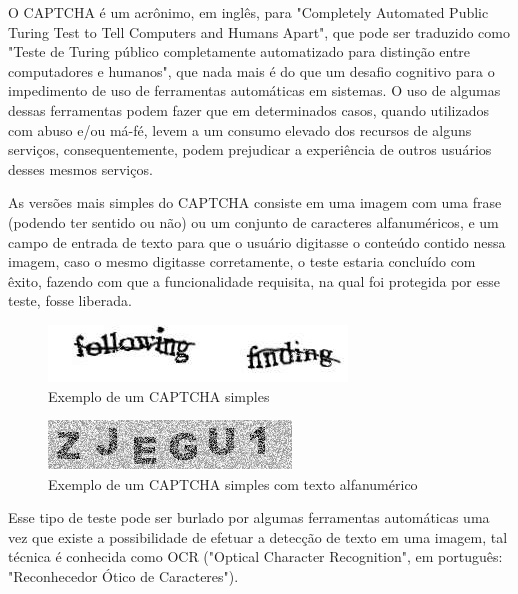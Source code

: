 O CAPTCHA é um acrônimo, em inglês, para "Completely Automated Public Turing Test to Tell Computers and Humans Apart", que pode ser traduzido como "Teste de Turing público completamente automatizado para distinção entre computadores e humanos", que nada mais é do que um desafio cognitivo para o impedimento de uso de ferramentas automáticas em sistemas. O uso de algumas dessas ferramentas podem fazer que em determinados casos, quando utilizados com abuso e/ou má-fé, levem a um consumo elevado dos recursos de alguns serviços, consequentemente, podem prejudicar a experiência de outros usuários desses mesmos serviços.

As versões mais simples do CAPTCHA consiste em uma imagem com uma frase (podendo ter sentido ou não) ou um conjunto de caracteres alfanuméricos, e um campo de entrada de texto para que o usuário digitasse o conteúdo contido nessa imagem, caso o mesmo digitasse corretamente, o teste estaria concluído com êxito, fazendo com que a funcionalidade requisita, na qual foi protegida por esse teste, fosse liberada.

\begin{figure}[h]
    \centering
    \includegraphics[scale=0.5]{tcc/figures/captcha/captcha-frase.jpg}
    \caption{Exemplo de um CAPTCHA simples}
    \label{fig-exemplo-captcha-simples}
\end{figure}

\begin{figure}[h]
    \centering
    \includegraphics[scale=0.5]{tcc/figures/captcha/captcha-alfanumerico.png}
    \caption{Exemplo de um CAPTCHA simples com texto alfanumérico}
    \label{fig-exemplo-captcha-alfanumerico}
\end{figure}

Esse tipo de teste pode ser burlado por algumas ferramentas automáticas uma vez que existe a possibilidade de efetuar a detecção de texto em uma imagem, tal técnica é conhecida como OCR ("Optical Character Recognition", em português: "Reconhecedor Ótico de Caracteres").

